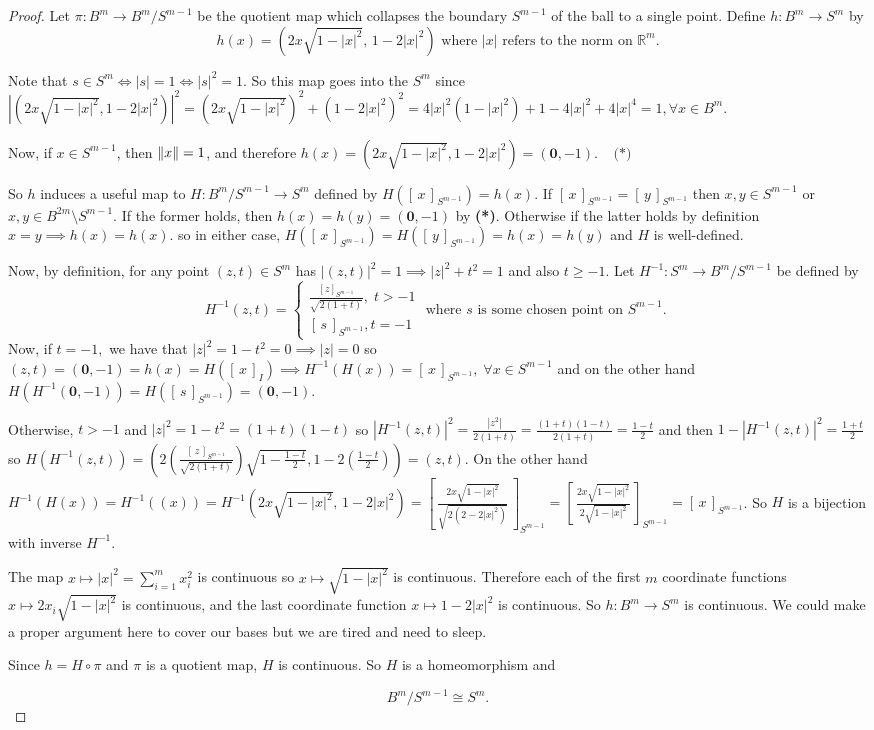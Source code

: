 \documentclass[addpoints,10pt]{exam}
\theoremstyle{plain}
\theoremstyle{definition}
\theoremstyle{plain}
\theoremstyle{plain}
\theoremstyle{definition}
\newcommand{\class}[2][]{\ensuremath{\left[\,#2\,\right]_{#1}}}
\newcommand{\RR}{\ensuremath{\mathbb{R}}}
\DeclarePairedDelimiter{\norm}{\lVert}{\rVert} %
\newcommand{\mbf}[1]{\ensuremath{\mathbf{#1}}}
\begin{document}
\begin{proof}
  Let $\pi:B^{m}\to B^{m}/S^{m-1}$ be the quotient map which collapses the boundary $S^{m-1}$ of the ball to a single point. Define $h:B^{m}\to S^{m}$ by
\[
h(x)=\left(2x\sqrt{1-|x|^{2}},\,1-2|x|^{2}\right)\text{ where $|x|$ refers to the norm on $\RR^{m}$}.
\]

Note that $s\in S^{m}\iff |s|= 1 \iff |s|^{2}=1.$ So this map goes into the $S^{m}$ since $|(2x\sqrt{1-|x|^{2}},1-2|x|^{2})|^{2}=(2x\sqrt{1-|x|^{2}})^{2}+(1-2|x|^{2})^{2}=4|x|^{2}(1-|x|^{2})+1-4|x|^{2}+4|x|^{4}=1,\forall x\in B^{m}.$

Now, if $x\in S^{m-1}$, then $\norm{x}=1$, and therefore $h(x)=(2x\sqrt{1-|x|^{2}},1-2|x|^{2})=(\mbf{0},-1).\;\;\;\;\textbf{(*)}$

So $h$ induces a useful map to $H:B^{m}/S^{m-1}\to S^{m}$ defined by $H(\class[S^{m-1}]{x})=h(x).$ If $\class[S^{m-1}]{x}=\class[S^{m-1}]{y}$ then $x,y\in S^{m-1}$ or $x,y\in B^{2m}\setminus S^{m-1}.$ If the former holds, then $h(x)=h(y)=(\mbf{0},-1)$ by \textbf{(*)}. Otherwise if the latter holds by definition $x=y\implies h(x)=h(x).$ so in either case, $H(\class[S^{m-1}]{x})=H(\class[S^{m-1}]{y})=h(x)=h(y)$ and $H$ is well-defined.

Now, by definition, for any point $(z,t)\in S^{m}$ has $|(z,t)|^{2}=1\implies |z|^{2}+t^{2}=1$ and also $t\geq -1.$ Let $H^{-1}:S^{m}\to B^{m}/S^{m-1}$ be defined by
  \[
  H^{-1}(z,t)=\begin{cases} \frac{[z]_{S^{m-1}}}{\sqrt{2(1+t)}},\; t>-1\\\class[S^{m-1}]{s},t=-1 \end{cases}
  \text{ where $s$ is some chosen point on $S^{m-1}$. }\]
Now, if $t=-1,$ we have that $|z|^{2}=1-t^{2}=0\implies |z|=0$ so $(z,t)=(\mathbf{0},-1)=h(x)=H(\class[I]{x})\implies H^{-1}(H(x))=\class[S^{m-1}]{x},\;\forall x\in S^{m-1}$ and on the other hand $H(H^{-1}(\mathbf{0},-1))=H(\class[S^{m-1}]{s})=(\mathbf{0},-1)$. 

Otherwise, $t>-1$ and $|z|^{2}=1-t^{2}=(1+t)(1-t)$ so $|H^{-1}(z,t)|^{2}=\frac{|z^{2}|}{2(1+t)}=\frac{(1+t)(1-t)}{2(1+t)}=\frac{1-t}{2}$ and then $1-|H^{-1}(z,t)|^{2}=\frac{1+t}{2}$ so $H(H^{-1}(z,t))=(2(\frac{\class[S^{m-1}]{z}}{\sqrt{2(1+t)}})\sqrt{1-\frac{1-t}{2}},1-2(\frac{1-t}{2}))=(z,t).$ On the other hand $H^{-1}(H(x))=H^{-1}((x))=H^{-1}(2x\sqrt{1-|x|^{2}},\,1-2|x|^{2})=\class[S^{m-1}]{\frac{2x\sqrt{1-|x|^{2}}}{\sqrt{2(2-2|x|^{2})}}}
=\class[S^{m-1}]{\frac{2x\sqrt{1-|x|^{2}}}{2\sqrt{1-|x|^{2}}}}
=\class[S^{m-1}]{x}$. So $H$ is a bijection with inverse $H^{-1}.$

The map $x\mapsto |x|^{2}=\sum_{i=1}^{m}x_i^{2}$ is continuous so
$x\mapsto\sqrt{1-|x|^{2}}$ is continuous. Therefore each of the
first $m$ coordinate functions $x\mapsto 2x_i\sqrt{1-|x|^{2}}$ is continuous,
and the last coordinate function $x\mapsto1-2|x|^{2}$ is continuous. So
$h:B^{m}\to S^{m}$ is continuous. We could make a proper argument here to cover our bases but we are tired and need to sleep. 

Since $h=H\circ\pi$ and $\pi$ is a quotient map, $H$ is continuous. So $H$ is a homeomorphism and 

$$B^{m}/S^{m-1}\cong S^{m}.$$
\end{proof}
\end{document}
